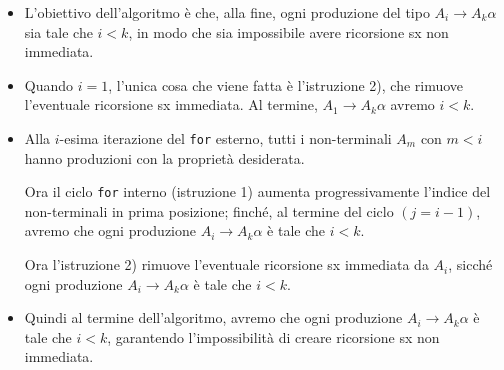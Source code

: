 \begin{itemize}
    \item L'obiettivo dell'algoritmo è che, alla fine, ogni produzione del tipo $A_i \to A_k \alpha$ sia tale che $i < k$, in modo che sia impossibile avere ricorsione sx non immediata.
    
    \item Quando $i = 1$, l'unica cosa che viene fatta è l'istruzione 2), che rimuove l'eventuale ricorsione sx immediata. Al termine, $A_1 \to A_k \alpha$ avremo $i < k$.
    
    \item Alla $i$-esima iterazione del \texttt{for} esterno, tutti i non-terminali $A_m$ con $m < i$ hanno produzioni con la proprietà desiderata.
    
    Ora il ciclo \texttt{for} interno (istruzione 1) aumenta progressivamente l'indice del non-terminali in prima posizione; finché, al termine del ciclo $(j = i - 1)$, avremo che ogni produzione $A_i \to A_k \alpha$ è tale che $i < k$.
    
    Ora l'istruzione 2) rimuove l'eventuale ricorsione sx immediata da $A_i$, sicché ogni produzione $A_i \to A_k \alpha$ è tale che $i < k$.
    
    \item Quindi al termine dell'algoritmo, avremo che ogni produzione $A_i \to A_k \alpha$ è tale che $i < k$, garantendo l'impossibilità di creare ricorsione sx non immediata.
\end{itemize}

